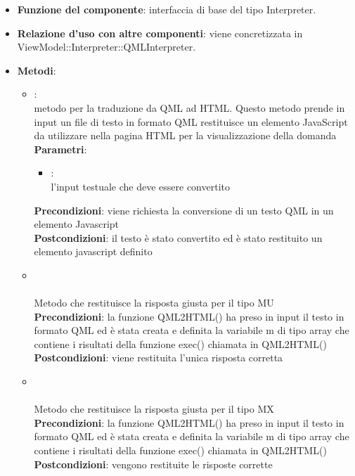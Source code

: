 \begin{itemize}
\item\textbf{Funzione del componente}: interfaccia di base del tipo Interpreter.
	\item\textbf{Relazione d'uso con altre componenti}: viene concretizzata in ViewModel::Interpreter::QMLInterpreter.\\
\item\textbf{Metodi}:
	\begin{itemize}
		\item{}:\\
		 metodo per la traduzione da QML ad HTML. Questo metodo prende in input un file di testo in formato QML restituisce un elemento JavaScript da utilizzare nella pagina HTML per la visualizzazione della domanda \\
		\textbf{Parametri}:
			\begin{itemize}
				\item{}:\\
				 l'input testuale che deve essere convertito \\
			\end{itemize}
		\textbf{Precondizioni}: viene richiesta la conversione di un testo QML in un elemento Javascript\\
		\textbf{Postcondizioni}: il testo è stato convertito ed è stato restituito un elemento javascript definito\\
		\item{}\\
		 \\Metodo che restituisce la risposta giusta per il tipo MU\\
		\textbf{Precondizioni}: la funzione QML2HTML() ha preso in input il testo in formato QML ed è stata creata e definita la variabile m di tipo array che contiene i risultati della funzione exec() chiamata in QML2HTML()\\
		\textbf{Postcondizioni}: viene restituita l'unica risposta corretta \\
		
		\item{}\\
		 \\Metodo che restituisce la risposta giusta per il tipo MX\\
		\textbf{Precondizioni}: la funzione QML2HTML() ha preso in input il testo in formato QML ed è stata creata e definita la variabile m di tipo array che contiene i risultati della funzione exec() chiamata in QML2HTML()\\
		\textbf{Postcondizioni}: vengono restituite le risposte corrette \\
		

\end{itemize}
\end{itemize}
